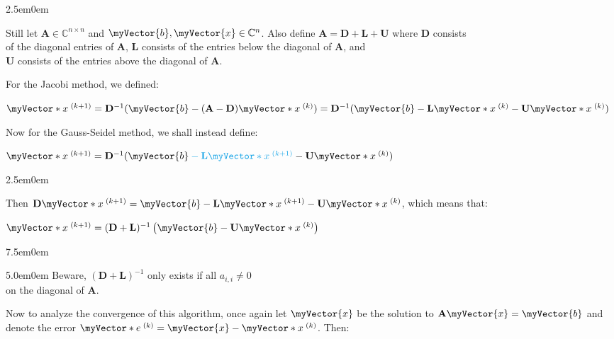 \documentclass{book}
\newcommand{\hTwo}{%
   \color{MidnightBlue}%
   \fontsize{13}{15}\selectfont%
}
\newcommand{\hThree}{%
   \color{PineGreen}
   \fontsize{13}{15}\selectfont%
}
\newenvironment{myIndent}{%
   \begin{adjustwidth}{2.5em}{0em}%
}{%
   \end{adjustwidth}%
}
\newenvironment{myDindent}{%
   \begin{adjustwidth}{5.0em}{0em}%
}{%
   \end{adjustwidth}%
}
\newenvironment{myTindent}{%
   \begin{adjustwidth}{7.5em}{0em}%
}{%
   \end{adjustwidth}%
}
\newcommand{\cyPen}[1]{{\vphantom{.}\color{Cerulean}#1}}
\newcommand{\retTwo}{\hfill\bigbreak}
\newcommand{\mVec}[1]{\myVector{#1}}
\newcommand{\mVecAst}[1]{\myVector*{#1}}
\newcommand{\mMat}[1]{\mathbf{#1}}
\begin{document}
   {\begin{myIndent} \hTwo
      Still let $\mMat{A} \in \mathbb{C}^{n\times n}$ and $\mVec{b}, \mVec{x} \in \mathbb{C}^n$. Also define $\mMat{A} = \mMat{D} + \mMat{L} + \mMat{U}$ where $\mMat{D}$ consists\\ of the diagonal entries of $\mMat{A}$, $\mMat{L}$ consists of the entries below the diagonal of $\mMat{A}$, and\\ $\mMat{U}$ consists of the entries above the diagonal of $\mMat{A}$.\retTwo

      For the Jacobi method, we defined: 
      
      {\center$\mVecAst{x}^{\phantom{.}(k+1)} = \mMat{D}^{-1}(\mVec{b} - (\mMat{A} - \mMat{D})\mVecAst{x}^{\phantom{.}(k)}) = \mMat{D}^{-1}(\mVec{b} - \mMat{L}\mVecAst{x}^{\phantom{.}(k)} - \mMat{U}\mVecAst{x}^{\phantom{.}(k)})$\retTwo\par}

      Now for the Gauss-Seidel method, we shall instead define:

      {\center$\mVecAst{x}^{\phantom{.}(k+1)} = \mMat{D}^{-1}(\mVec{b}\vphantom{.}\cyPen{\vphantom{.} - \mMat{L}\mVecAst{x}^{\phantom{.}(k+1)}} - \mMat{U}\mVecAst{x}^{\phantom{.}(k)})$\retTwo\par}

      {\begin{myIndent} \hThree
         Then $ \mMat{D}\mVecAst{x}^{\phantom{.}(k+1)} = \mVec{b} - \mMat{L}\mVecAst{x}^{\phantom{.}(k+1)} - \mMat{U}\mVecAst{x}^{\phantom{.}(k)}$, which means that:
         
         {\centering$\mVecAst{x}^{\phantom{.}(k+1)} = (\mMat{D} + \mMat{L})^{-1}\left(\mVec{b} - \mMat{U}\mVecAst{x}^{\phantom{.}(k)}\right)$\par}

         {\begin{myTindent}\begin{myDindent} \color{BrickRed}
            Beware, $(\mMat{D} + \mMat{L})^{-1}$ only exists if all $a_{i,i} \neq 0$\\ on the diagonal of $\mMat{A}$.\retTwo
         \end{myDindent}\end{myTindent}}

         Now to analyze the convergence of this algorithm, once again let $\mVec{x}$ be the solution to $\mMat{A}\mVec{x} = \mVec{b}$ and denote the error $\mVecAst{e}^{\phantom{.}(k)} = \mVec{x} - \mVecAst{x}^{\phantom{.}(k)}$. Then:\\


\end{myIndent}}
\end{myIndent}}
\end{document}
